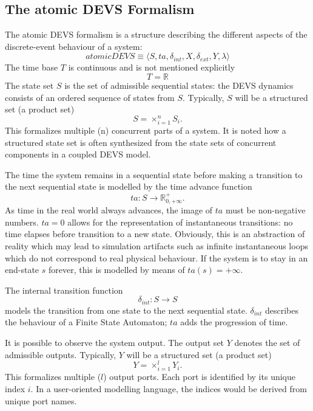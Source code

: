 \subsection{The atomic DEVS Formalism}
The atomic DEVS formalism is a structure describing the different aspects of the discrete-event behaviour of a system:
\begin{equation}
    atomicDEVS \equiv \langle S, ta, \delta_{int}, X, \delta_{ext}, Y, \lambda \rangle
\end{equation}
The time base $T$ is continuous and is not mentioned explicitly
\begin{equation}
    T = \mathbb{R}
\end{equation}
The state set $S$ is the set of admissible sequential states: the DEVS dynamics consists of an ordered sequence of states
from $S$. Typically, $S$ will be a structured set (a product set)
\begin{equation}
    S = \times_{i=1}^{n} S_i.
\end{equation}
This formalizes multiple (n) concurrent parts of a system. It is noted how a structured state set is often synthesized
from the state sets of concurrent components in a coupled DEVS model. 

The time the system remains in a sequential state before making a transition to the next sequential state is modelled by 
the time advance function
\begin{equation}
    ta: S \rightarrow \mathbb{R}^+_{0, + \infty}.
\end{equation}
As time in the real world always advances, the image of $ta$ must be non-negative numbers. $ta = 0$ allows for the 
representation of instantaneous transitions: no time elapses before transition to a new state. Obviously, this is an 
abstraction of reality which may lead to simulation artifacts such as infinite instantaneous loops which do not correspond 
to real physical behaviour. If the system is to stay in an end-state $s$ forever, this is modelled by means of $ta(s) = +\infty$.

The internal transition function
\begin{equation}
    \delta_{int}: S \rightarrow S
\end{equation}
models the transition from one state to the next sequential state. $\delta_{int}$ describes the behaviour of a Finite State 
Automaton; $ta$ adds the progression of time.

It is possible to observe the system output. The output set $Y$ denotes the set of admissible outputs. Typically, $Y$ will be a 
structured set (a product set)
\begin{equation}
    Y = \times_{i=1}^l Y_i.
\end{equation}
This formalizes multiple ($l$) output ports. Each port is identified by its unique index $i$. In a user-oriented modelling 
language, the indices would be derived from unique port names. 

